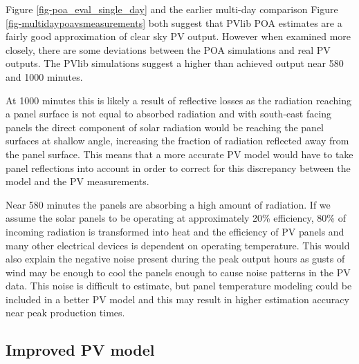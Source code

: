 \noindent 
Figure \ref{fig-poa_eval_single_day} and the earlier multi-day comparison Figure \ref{fig-multidaypoavsmeasurements} both suggest that PVlib POA estimates are a fairly good approximation of clear sky PV output. However when examined more closely, there are some deviations between the POA simulations and real PV outputs. The PVlib simulations suggest a higher than achieved output near 580 and 1000 minutes. 

At 1000 minutes this is likely a result of reflective losses as the radiation reaching a panel surface is not equal to absorbed radiation and with south-east facing panels the direct component of solar radiation would be reaching the panel surfaces at shallow angle, increasing the fraction of radiation reflected away from the panel surface. This means that a more accurate PV model would have to take panel reflections into account in order to correct for this discrepancy between the model and the PV measurements.

Near 580 minutes the panels are absorbing a high amount of radiation. If we assume the solar panels to be operating at approximately 20\% efficiency, 80\% of incoming radiation is transformed into heat and the efficiency of PV panels and many other electrical devices is dependent on operating temperature. This would also explain the negative noise present during the peak output hours as gusts of wind may be enough to cool the panels enough to cause noise patterns in the PV data. This noise is difficult to estimate, but panel temperature modeling could be included in a better PV model and this may result in higher estimation accuracy near peak production times.




\newpage

\subsection{Improved PV model}

